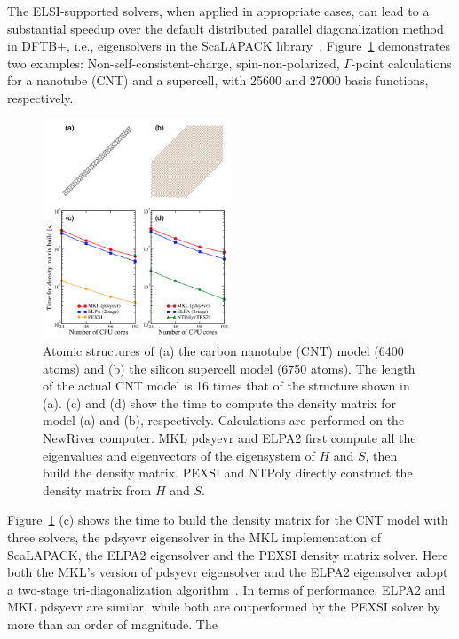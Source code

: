 \documentclass[reprint,onecolumn,superscriptaddress]{revtex4-1}
\newcommand{\dftbp}{DFTB+}
\begin{document}
The ELSI-supported solvers, when applied in appropriate cases, can lead to a substantial
speedup over the default distributed parallel diagonalization method in \dftbp{}, i.e.,
eigensolvers in the ScaLAPACK
library~\cite{scalapack_blackford_1997,dc_tisseur_1999,mrrr_vomel_2010}.
Figure~\ref{fig:solvers} demonstrates two examples: Non-self-consistent-charge,
spin-non-polarized, $\Gamma$-point calculations for a  nanotube (CNT)
and a  supercell, with 25600 and 27000 basis functions, respectively.
\begin{figure}[htbp]
  \centering
  \includegraphics[width=0.5\textwidth]{figures/solvers.png}
  \caption{Atomic structures of (a) the carbon nanotube (CNT) model (6400
    atoms) and (b) the silicon supercell model (6750 atoms). The length of the
    actual CNT model is 16 times that of the structure shown in (a). (c) and (d)
    show the time to compute the density matrix for model (a) and (b),
    respectively. Calculations are performed on the NewRiver computer. MKL
    pdsyevr and ELPA2 first compute all the eigenvalues and eigenvectors of the
    eigensystem of $H$ and $S$, then build the density matrix. PEXSI and NTPoly
    directly construct the density matrix from $H$ and $S$.}
  \label{fig:solvers}
\end{figure}
Figure~\ref{fig:solvers} (c) shows the time to build the density matrix for the
CNT model with three solvers, the pdsyevr eigensolver in the MKL implementation
of ScaLAPACK, the ELPA2 eigensolver and the PEXSI density matrix solver. Here
both the MKL's version of pdsyevr eigensolver and the ELPA2 eigensolver adopt a
two-stage tri-diagonalization
algorithm~\cite{2stage_bischof_1994,elpa_marek_2014,mkl_arturov_2018}. In terms
of performance, ELPA2 and MKL pdsyevr are similar, while both are outperformed
by the PEXSI solver by more than an order of magnitude. The
\end{document}
